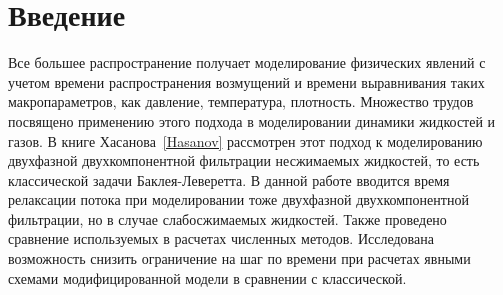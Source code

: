 \section{Введение}
Все большее распространение получает моделирование физических явлений
с учетом времени распространения возмущений и времени выравнивания таких макропараметров,
как давление, температура, плотность.
Множество трудов посвящено применению этого подхода в моделировании динамики
жидкостей и газов. В книге Хасанова~\ref{Hasanov} рассмотрен этот подход к моделированию
двухфазной двухкомпонентной фильтрации несжимаемых жидкостей, то есть классической задачи Баклея-Леверетта.
В данной работе вводится время релаксации потока при моделировании тоже двухфазной двухкомпонентной
фильтрации, но в случае слабосжимаемых жидкостей. Также проведено сравнение используемых в расчетах численных методов.
Исследована возможность снизить ограничение на шаг по времени при расчетах явными схемами
модифицированной модели в сравнении с классической.